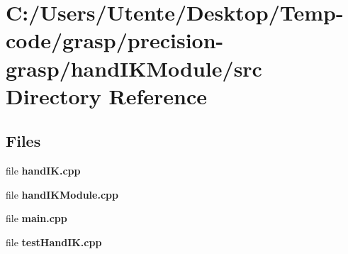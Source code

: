 \section{C\+:/\+Users/\+Utente/\+Desktop/\+Temp-\/code/grasp/precision-\/grasp/hand\+I\+K\+Module/src Directory Reference}
\label{dir_22490a34635d7d1867ca856a970e0bec}
\subsection*{Files}
\begin{DoxyCompactItemize}
\item 
file {\bfseries hand\+I\+K.\+cpp}
\item 
file {\bfseries hand\+I\+K\+Module.\+cpp}
\item 
file {\bfseries main.\+cpp}
\item 
file {\bfseries test\+Hand\+I\+K.\+cpp}
\end{DoxyCompactItemize}
